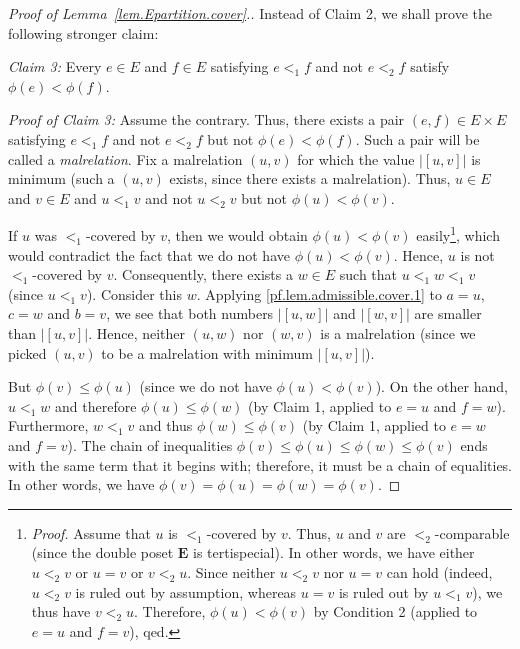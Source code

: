 \documentclass[12pt]{article}
\theoremstyle{plain}
\theoremstyle{definition}
\theoremstyle{remark}
\newcommand{\EE}{{\mathbf{E}}}
\begin{document}
\begin{proof}[Proof of Lemma~\ref{lem.Epartition.cover}.]
Instead of Claim 2, we shall prove the following stronger claim:

\textit{Claim 3:} Every $e \in E$ and $f \in E$ satisfying
$e <_1 f$ and not $e <_2 f$ satisfy
$\phi\left(e\right) < \phi\left(f\right)$.

\textit{Proof of Claim 3:} Assume the contrary. Thus, there
exists a pair $\left(e, f\right) \in E \times E$ satisfying
$e <_1 f$ and not $e <_2 f$ but not
$\phi\left(e\right) < \phi\left(f\right)$.
Such a pair will be called a \textit{malrelation}. Fix a
malrelation $\left(u, v\right)$ for which the value
$\left|\left[u, v\right]\right|$ is minimum (such a
$\left(u, v\right)$ exists, since there exists a malrelation).
Thus, $u \in E$ and $v \in E$ and $u <_1 v$ and not $u <_2 v$
but not $\phi\left(u\right) < \phi\left(v\right)$.

If $u$ was $<_1$-covered by $v$, then we would obtain
$\phi\left(u\right) < \phi\left(v\right)$
easily\footnote{\textit{Proof.} Assume that $u$ is
$<_1$-covered by $v$. Thus, $u$ and $v$ are $<_2$-comparable
(since the double poset $\EE$ is tertispecial). In other words,
we have either $u <_2 v$ or $u = v$ or $v <_2 u$. Since
neither $u <_2 v$ nor $u = v$ can hold (indeed, $u <_2 v$
is ruled out by assumption, whereas $u = v$ is ruled out by
$u <_1 v$), we thus have $v <_2 u$. Therefore,
$\phi\left(u\right) < \phi\left(v\right)$
by Condition 2 (applied to $e = u$ and $f = v$), qed.}, which
would contradict the fact that we do not have
$\phi\left(u\right) < \phi\left(v\right)$. Hence, $u$ is not
$<_1$-covered by $v$. Consequently, there exists a $w \in E$
such that $u <_1 w <_1 v$ (since $u <_1 v$). Consider this
$w$. Applying \eqref{pf.lem.admissible.cover.1} to $a = u$,
$c = w$ and $b = v$, we see that both numbers
$\left|\left[u, w\right]\right|$ and
$\left|\left[w, v\right]\right|$ are smaller than
$\left|\left[u, v\right]\right|$. Hence, neither
$\left(u, w\right)$ nor $\left(w, v\right)$ is a malrelation
(since we picked $\left(u, v\right)$ to be a malrelation with
minimum $\left|\left[u, v\right]\right|$).

But $\phi\left(v\right) \leq \phi\left(u\right)$ (since we do
not have $\phi\left(u\right) < \phi\left(v\right)$). On the
other hand, $u <_1 w$ and therefore $\phi\left(u\right) \leq
\phi\left(w\right)$ (by Claim 1, applied to $e = u$ and
$f = w$). Furthermore, $w <_1 v$ and
thus $\phi\left(w\right) \leq \phi\left(v\right)$ (by Claim 1,
applied to $e = w$ and $f = v$).
The chain of inequalities
$\phi\left(v\right) \leq \phi\left(u\right)
\leq \phi\left(w\right) \leq \phi\left(v\right)$ ends with
the same term that it begins with; therefore, it must be a chain
of equalities. In other words, we have
$\phi\left(v\right) = \phi\left(u\right)
= \phi\left(w\right) = \phi\left(v\right)$.


\end{proof}
\end{document}
